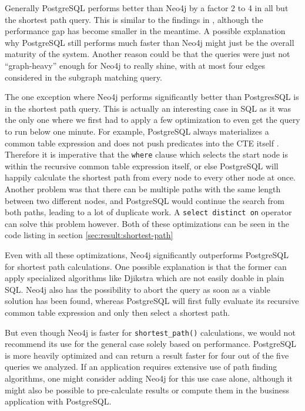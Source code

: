 \documentclass[11pt, a4paper,oneside,chapterprefix=false]{scrbook}
\begin{document}
Generally PostgreSQL performs better than Neo4j by a factor 2 to 4 in all but the shortest path query.
This is similar to the findings in \cite{graphdbbenchmark}, although the performance gap has become smaller in the meantime.
A possible explanation why PostgreSQL still performs much faster than Neo4j might just be the overall maturity of the system.
Another reason could be that the queries were just not ``graph-heavy'' enough for Neo4j to really shine, with at most four edges considered in the subgraph matching query.

The one exception where Neo4j performs significantly better than PostgresSQL is in the shortest path query.
This is actually an interesting case in SQL as it was the only one where we first had to apply a few optimization to even get the query to run below one minute. For example, PostgreSQL always materializes a common table expression and does not push predicates into the CTE itself \cite{postgresMaterialize}.
Therefore it is imperative that the \lstinline{where} clause which selects the start node is within the recursive common table expression itself, or else PostgreSQL will happily calculate the shortest path from every node to every other node at once. Another problem was that there can be multiple paths with the same length between two different nodes, and PostgreSQL would continue the search from both paths, leading to a lot of duplicate work. A \lstinline{select distinct on} operator can solve this problem however.
Both of these optimizations can be seen in the code listing in section \ref{sec:result:shortest-path}

Even with all these optimizations, Neo4j significantly outperforms PostgreSQL for shortest path calculations.
One possible explanation is that the former can apply specialized algorithms like Djikstra \cite{dijkstra} which are not easily doable in plain SQL. Neo4j also has the possibility to abort the query as soon as a viable solution has been found, whereas PostgreSQL will first fully evaluate its recursive common table expression and only then select a shortest path.

But even though Neo4j is faster for \lstinline{shortest_path()} calculations, we would not recommend its use for the general case solely based on performance. 
PostgreSQL is more heavily optimized and can return a result faster for four out of the five queries we analyzed. 
If an application requires extensive use of path finding algorithms, one might consider adding Neo4j for this use case alone, although it might also be possible to pre-calculate results or compute them in the business application with PostgreSQL.
\end{document}
